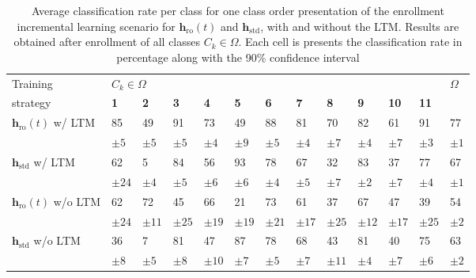 \begin{table*}[tb]
  \small
  \centering
  \caption{Average classification rate per class for one class order presentation of the enrollment incremental learning scenario for $\textbf{h}_\text{ro}(t)$ and $\textbf{h}_\text{std}$, with and without the LTM. Results are obtained after enrollment of all classes $C_k\in\Omega$. Each cell is presents the classification rate in percentage along with the 90\% confidence interval}
  \footnotesize{
  \begin{tabular}{|l|lllllllllll|l|}
  	\hline
    Training &\multicolumn{11}{l|}{$C_k \in \Omega$} &\multirow{2}{*}{$\Omega$}
    \\ \cline{2-12}
    strategy &{\bf 1} &{\bf 2} &{\bf 3}  &{\bf 4}  &{\bf 5} & 
    {\bf 6} &{\bf 7} &{\bf 8} &{\bf 9} &{\bf 10} &{\bf 11} &
    \\ \hline \hline
		\multirow{2}{*}{$\textbf{h}_\text{ro}(t)$ w/ LTM}
		& 85 & 49 & 91 & 73 & 49 & 88 & 81 & 70 & 82 & 61 & 91 & 77
		\\ 
 		& $\pm 5$ & $\pm 5$ & $\pm 5$ & $\pm 4$ & $\pm 9$ & $\pm 5$ & $\pm 4$
 		& $\pm 7$ & $\pm 4$ & $\pm 7$ & $\pm 3$ & $\pm 1$
 		\\ \hline 
		\multirow{2}{*}{$\textbf{h}_\text{std}$ w/ LTM}
		& 62 & 5 & 84 & 56 & 93 & 78 & 67 & 32 & 83 & 37 & 77 & 67
		\\ 
		& $\pm 24$ & $\pm 4$ & $\pm 5$ & $\pm 6$ & $\pm 6$ & $\pm 4$ & $\pm 5$
		& $\pm 7$ & $\pm 2$ & $\pm 7$ & $\pm 4$ & $\pm 1$
		\\ \hline \hline 
		\multirow{2}{*}{$\textbf{h}_\text{ro}(t)$ w/o LTM}
		& 62 & 72 & 45 & 66 & 21 & 73 & 61 & 37 & 67 & 47 & 39 & 54
		\\ 
		& $\pm 24$ & $\pm 11$ & $\pm 25$ & $\pm 19$ & $\pm 19$ & $\pm 21$ 
		& $\pm 17$ & $\pm 25$ & $\pm 12$ & $\pm 17$ & $\pm 25$ & $\pm 2$
		\\ \hline 
		\multirow{2}{*}{$\textbf{h}_\text{std}$ w/o LTM}
		& 36 & 7 & 81 & 47 & 87 & 78 & 68 & 43 & 81 & 40 & 75 & 63
		\\ 
		& $\pm 8$ & $\pm 5$ & $\pm 8$ & $\pm 10$ & $\pm 7$ & $\pm 5$ & $\pm 7$
		& $\pm 11$ & $\pm 4$ & $\pm 7$ & $\pm 6$ & $\pm 2$
		\\ \hline 
	\end{tabular} }
	\label{tab:c1_AddExt}
\end{table*}

